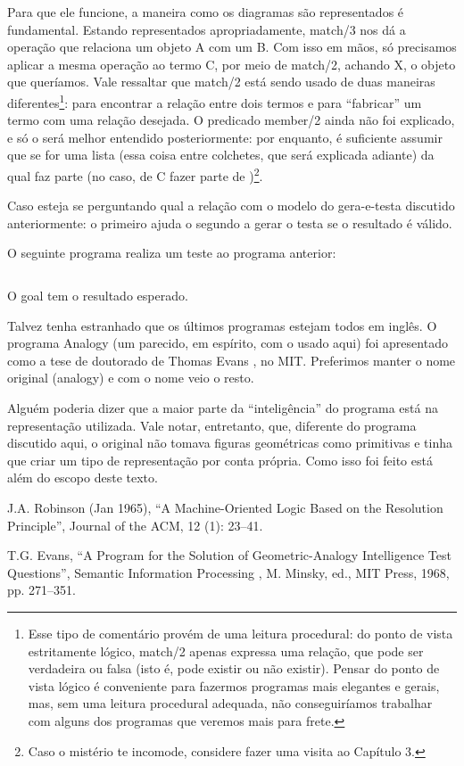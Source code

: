 \documentclass{article}
\begin{document}
Para que ele funcione, a maneira como os diagramas são representados é fundamental. Estando representados apropriadamente, match/3 nos dá a operação que relaciona um objeto A com um B. Com isso em mãos, só precisamos aplicar a mesma operação ao termo C, por meio de match/2, achando X, o objeto que queríamos. Vale ressaltar que match/2 está sendo usado de duas maneiras diferentes\footnote{Esse tipo de comentário provém de uma leitura procedural: do ponto de
  vista estritamente lógico, match/2 apenas expressa uma relação, que pode ser verdadeira ou falsa (isto é, pode existir ou não existir). Pensar do ponto de vista lógico é conveniente para fazermos programas mais elegantes e gerais, mas, sem uma leitura procedural adequada, não conseguiríamos trabalhar com alguns dos programas que veremos mais para frete.}: para encontrar a relação entre dois termos e para ``fabricar'' um termo com uma relação
desejada. O predicado member/2 ainda não foi explicado, e só o será melhor entendido posteriormente: por enquanto, é suficiente assumir que  se  for uma lista (essa coisa entre colchetes, que será explicada adiante) da qual  faz parte (no caso, de C fazer parte de )\footnote{Caso o mistério te incomode, considere fazer uma visita ao Capítulo 3.}.

Caso esteja se perguntando qual a relação com o modelo do gera-e-testa discutido anteriormente: o primeiro  ajuda o segundo a gerar o  testa se o resultado é válido.

O seguinte programa realiza um teste ao programa anterior:

%
\inputminted{prolog}{../Exemplos/Cap1/prog4_testanalogy.pl}

O goal  tem o resultado esperado.

Talvez tenha estranhado que os últimos programas estejam todos em inglês. O programa Analogy (um parecido, em espírito, com o usado aqui) foi apresentado como a tese de doutorado de Thomas Evans \cite{evans}, no MIT. Preferimos manter o nome original (analogy) e com o nome veio o resto.

Alguém poderia dizer que a maior parte da ``inteligência'' do programa está na representação utilizada.
Vale notar, entretanto, que, diferente do programa discutido aqui, o original não tomava figuras geométricas como
primitivas e tinha que criar um tipo de representação por conta própria. Como isso foi feito está além do escopo deste texto.


  \begin{thebibliography}{1}

    J.A. Robinson (Jan 1965), ``A Machine-Oriented Logic Based on the Resolution Principle'', Journal of the ACM, 12 (1): 23–41.

    T.G. Evans, “A Program for the Solution of Geometric-Analogy Intelligence Test Questions”, Semantic Information Processing , M. Minsky, ed., MIT Press, 1968, pp. 271–351.

  \end{thebibliography}
\end{document}
